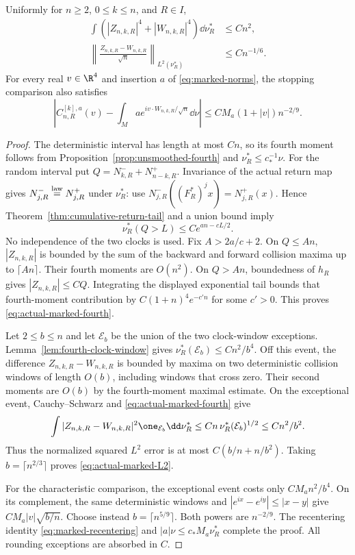 \begin{theorem}
\label{thm:marked-L2-stopping}
Uniformly for $n\ge2$, $0\le k\le n$, and $R\in I$,
\begin{align}
 \int (|Z_{n,k,R}|^4+|W_{n,k,R}|^4)\dd\nu_R^*&\le Cn^2,
       \label{eq:actual-marked-fourth}\\
 \left\|\frac{Z_{n,k,R}-W_{n,k,R}}{\sqrt n}
                  \right\|_{L^2(\nu_R^*)}&\le Cn^{-1/6}.
       \label{eq:actual-marked-L2}
\end{align}
For every real $v\in\R^4$ and insertion $a$ of
\eqref{eq:marked-norms}, the stopping comparison also satisfies
\begin{equation}\label{eq:improved-marked-stopping}
 \left|C^{[k],a}_{n,R}(v)
       -\int_M a e^{iv\cdot W_{n,k,R}/\sqrt n}\dd\nu\right|
       \le C M_a(1+|v|)n^{-2/9}.
\end{equation}
\end{theorem}
\begin{proof}
The deterministic interval has length at most $Cn$, so its fourth
moment follows from Proposition~\ref{prop:unsmoothed-fourth} and
$\nu_R^*\le c_*^{-1}\nu$. For the random interval put
$Q=N^-_{k,R}+N^+_{n-k,R}$. Invariance of the actual return map gives
$N^-_{j,R}\overset{\rm law}=N^+_{j,R}$ under $\nu_R^*$: use
$N^-_{j,R}((F_R^*)^jx)=N^+_{j,R}(x)$. Hence
Theorem~\ref{thm:cumulative-return-tail} and a union bound imply
\[
 \nu_R^*(Q>L)\le C e^{an-cL/2}.
\]
No independence of the two clocks is used. Fix $A>2a/c+2$.
On $Q\le An$, $|Z_{n,k,R}|$ is bounded by the sum of the backward
and forward collision maxima up to $\lceil An\rceil$. Their fourth
moments are $O(n^2)$. On $Q>An$, boundedness of $h_R$ gives
$|Z_{n,k,R}|\le C Q$. Integrating the displayed exponential tail
bounds that fourth-moment contribution by
$C(1+n)^4e^{-c' n}$ for some $c'>0$. This proves
\eqref{eq:actual-marked-fourth}.

Let $2\le b\le n$ and let $\mathcal E_b$ be the union of the two
clock-window exceptions. Lemma~\ref{lem:fourth-clock-window} gives
$\nu_R^*(\mathcal E_b)\le Cn^2/b^4$. Off this event, the difference
$Z_{n,k,R}-W_{n,k,R}$ is bounded by maxima on two deterministic
collision windows of length $O(b)$, including windows that cross zero.
Their second moments are $O(b)$ by the fourth-moment maximal estimate.
On the exceptional event, Cauchy--Schwarz and
\eqref{eq:actual-marked-fourth} give
\[
 \int |Z_{n,k,R}-W_{n,k,R}|^2\one_{\mathcal E_b}\dd\nu_R^*
       \le Cn\,\nu_R^*(\mathcal E_b)^{1/2}\le Cn^2/b^2.
\]
Thus the normalized squared $L^2$ error is at most
$C(b/n+n/b^2)$. Taking $b=\lceil n^{2/3}\rceil$ proves
\eqref{eq:actual-marked-L2}.

For the characteristic comparison, the exceptional event costs only
$CM_a n^2/b^4$. On its complement, the same deterministic windows and
$|e^{ix}-e^{iy}|\le|x-y|$ give $CM_a|v|\sqrt{b/n}$.
Choose instead $b=\lceil n^{5/9}\rceil$. Both powers are
$n^{-2/9}$. The recentering identity
\eqref{eq:marked-recentering} and $|a|\nu\le c_*M_a\nu_R^*$
complete the proof. All rounding exceptions are absorbed in $C$.
\end{proof}

